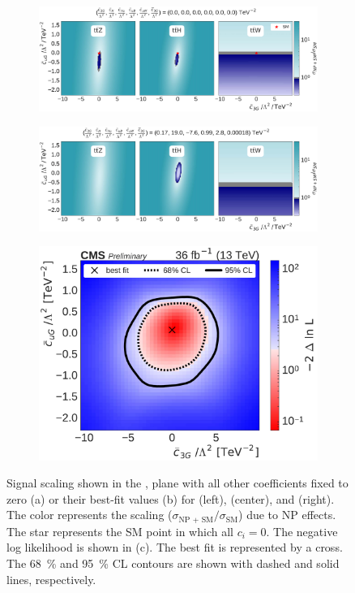 \begin{figure}
  \vspace{-1cm}
  \begin{subfigure}{\linewidth}
    \centering
    \includegraphics[width=\linewidth]{figures/thirteen-TeV/scaling-frozen/c3G_cuG}
    \caption{}
  \end{subfigure}
  \begin{subfigure}{\linewidth}
    \centering
    \includegraphics[width=\linewidth]{figures/thirteen-TeV/scaling/c3G_cuG}
    \caption{}
  \end{subfigure}
  \begin{subfigure}{\linewidth}
    \centering
    \includegraphics[width=0.6\linewidth]{figures/thirteen-TeV/nll/c3G_cuG}
    \caption{}
  \end{subfigure}
  \vspace{-1cm}
  \setlength{\capwidth}{15cm}
  \caption[Signal scaling and profile likelihood scan in the \cthreeG, \cuG plane]{Signal scaling
  shown in the \cthreeG, \cuG plane with all other coefficients fixed to zero (a) or their best-fit
  values (b) for \ttZ (left), \ttH (center), and \ttW (right). The color represents the scaling
  ($\sigma_\text{NP + SM} / \sigma_\text{SM}$) due to NP effects. The star represents the SM point in
  which all $c_i=0$. The negative log likelihood is shown in (c). The best fit is represented by a
  cross. The \SI{68}{\percent} and \SI{95}{\percent} CL contours are shown with dashed and solid
  lines, respectively.}
\end{figure}

